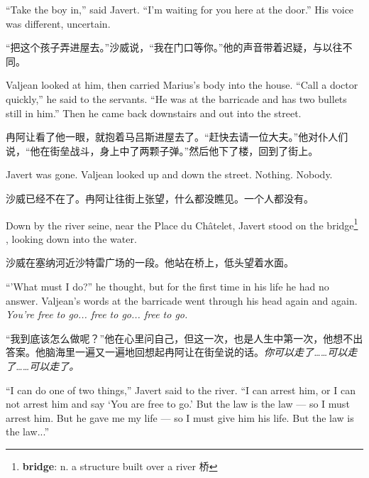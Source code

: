 \documentclass[fontset=ubuntu, zihao=5]{ctexart}
\begin{document}
\begin{paracol}{2}
\switchcolumn*

``Take the boy in,'' said Javert. ``I'm waiting for you here at the door.'' His voice was different, uncertain.


\switchcolumn

“把这个孩子弄进屋去。”沙威说，“我在门口等你。”他的声音带着迟疑，与以往不同。

\switchcolumn*

Valjean looked at him, then carried Marius's body into the house. ``Call a doctor quickly,'' he said to the servants. ``He was at the barricade and has two bullets still in him.'' Then he came back downstairs and out into the street.

\switchcolumn

冉阿让看了他一眼，就抱着马吕斯进屋去了。“赶快去请一位大夫。”他对仆人们说，“他在街垒战斗，身上中了两颗子弹。”然后他下了楼，回到了街上。

\switchcolumn*

Javert was gone. Valjean looked up and down the street. Nothing. Nobody.

\switchcolumn

沙威已经不在了。冉阿让往街上张望，什么都没瞧见。一个人都没有。

\switchcolumn*

\sectionbreak

Down by the river seine, near the Place du Châtelet, Javert stood on the
bridge\footnote{\textbf{bridge}: n. a structure built over a river 桥} ,
looking down into the water.

\switchcolumn

\sectionbreak

沙威在塞纳河近沙特雷广场的一段。他站在桥上，低头望着水面。

\switchcolumn*

``'What must I do?'' he thought, but for the first time in his life he had no answer. Valjean's words at the barricade went through his head again and again. \emph{You're free to go... free to go... free to go.}

\switchcolumn

“我到底该怎么做呢？”他在心里问自己，但这一次，也是人生中第一次，他想不出答案。他脑海里一遍又一遍地回想起冉阿让在街垒说的话。\emph{你可以走了……可以走了……可以走了。}

\switchcolumn*

``I can do one of two things,'' Javert said to the river. ``I can arrest him, or I can not arrest him and say `You are free to go.' But the law is the law --- so I must arrest him. But he gave me my life --- so I must give him his life. But the law is the law...''


\end{paracol}
\end{document}
